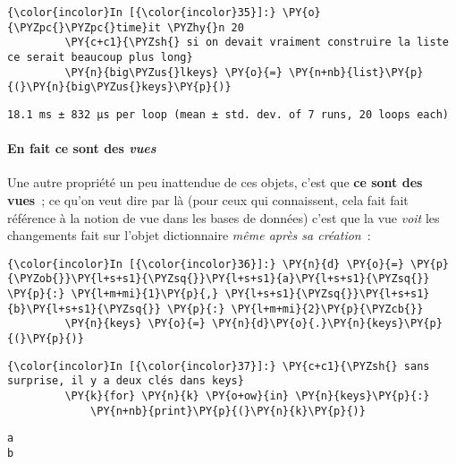     \begin{Verbatim}[commandchars=\\\{\}]
{\color{incolor}In [{\color{incolor}35}]:} \PY{o}{\PYZpc{}\PYZpc{}time}it \PYZhy{}n 20
         \PY{c+c1}{\PYZsh{} si on devait vraiment construire la liste ce serait beaucoup plus long}
         \PY{n}{big\PYZus{}lkeys} \PY{o}{=} \PY{n+nb}{list}\PY{p}{(}\PY{n}{big\PYZus{}keys}\PY{p}{)}
\end{Verbatim}


    \begin{Verbatim}[commandchars=\\\{\}]
18.1 ms ± 832 µs per loop (mean ± std. dev. of 7 runs, 20 loops each)

    \end{Verbatim}

    \hypertarget{en-fait-ce-sont-des-vues}{%
\paragraph{\texorpdfstring{En fait ce sont des
\emph{vues}}{En fait ce sont des vues}}\label{en-fait-ce-sont-des-vues}}

    Une autre propriété un peu inattendue de ces objets, c'est que
\textbf{ce sont des vues}~; ce qu'on veut dire par là (pour ceux qui
connaissent, cela fait fait référence à la notion de vue dans les bases
de données) c'est que la vue \emph{voit} les changements fait sur
l'objet dictionnaire \emph{même après sa création}~:

    \begin{Verbatim}[commandchars=\\\{\}]
{\color{incolor}In [{\color{incolor}36}]:} \PY{n}{d} \PY{o}{=} \PY{p}{\PYZob{}}\PY{l+s+s1}{\PYZsq{}}\PY{l+s+s1}{a}\PY{l+s+s1}{\PYZsq{}} \PY{p}{:} \PY{l+m+mi}{1}\PY{p}{,} \PY{l+s+s1}{\PYZsq{}}\PY{l+s+s1}{b}\PY{l+s+s1}{\PYZsq{}} \PY{p}{:} \PY{l+m+mi}{2}\PY{p}{\PYZcb{}}
         \PY{n}{keys} \PY{o}{=} \PY{n}{d}\PY{o}{.}\PY{n}{keys}\PY{p}{(}\PY{p}{)}
\end{Verbatim}


    \begin{Verbatim}[commandchars=\\\{\}]
{\color{incolor}In [{\color{incolor}37}]:} \PY{c+c1}{\PYZsh{} sans surprise, il y a deux clés dans keys}
         \PY{k}{for} \PY{n}{k} \PY{o+ow}{in} \PY{n}{keys}\PY{p}{:}
             \PY{n+nb}{print}\PY{p}{(}\PY{n}{k}\PY{p}{)}
\end{Verbatim}


    \begin{Verbatim}[commandchars=\\\{\}]
a
b

    \end{Verbatim}

